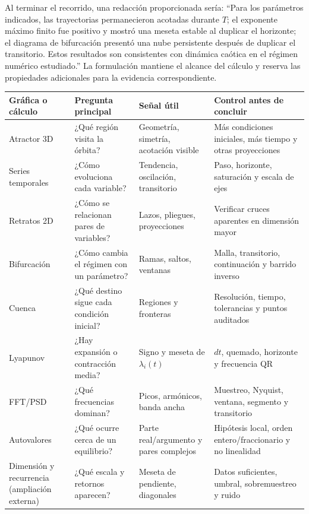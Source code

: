 \documentclass[11pt,a4paper]{article}
\begin{document}
Al terminar el recorrido, una redacción proporcionada sería: ``Para los parámetros
indicados, las trayectorias
permanecieron acotadas durante $T$; el exponente máximo finito fue positivo y mostró
una meseta estable al duplicar el horizonte; el diagrama de bifurcación presentó una
nube persistente después de duplicar el transitorio. Estos resultados son consistentes
con dinámica caótica en el régimen numérico estudiado.'' La formulación mantiene el
alcance del cálculo y reserva las propiedades adicionales para la evidencia correspondiente.

\begin{longtable}{>{\raggedright\arraybackslash}p{}
                  >{\raggedright\arraybackslash}p{}
                  >{\raggedright\arraybackslash}p{}
                  >{\raggedright\arraybackslash}p{}}
\toprule
Gráfica o cálculo & Pregunta principal & Señal útil & Control antes de concluir\\
\midrule
\endhead
Atractor 3D & ¿Qué región visita la órbita? & Geometría, simetría, acotación visible & Más condiciones iniciales, más tiempo y otras proyecciones\\
Series temporales & ¿Cómo evoluciona cada variable? & Tendencia, oscilación, transitorio & Paso, horizonte, saturación y escala de ejes\\
Retratos 2D & ¿Cómo se relacionan pares de variables? & Lazos, pliegues, proyecciones & Verificar cruces aparentes en dimensión mayor\\
Bifurcación & ¿Cómo cambia el régimen con un parámetro? & Ramas, saltos, ventanas & Malla, transitorio, continuación y barrido inverso\\
Cuenca & ¿Qué destino sigue cada condición inicial? & Regiones y fronteras & Resolución, tiempo, tolerancias y puntos auditados\\
Lyapunov & ¿Hay expansión o contracción media? & Signo y meseta de $\lambda_i(t)$ & $dt$, quemado, horizonte y frecuencia QR\\
FFT/PSD & ¿Qué frecuencias dominan? & Picos, armónicos, banda ancha & Muestreo, Nyquist, ventana, segmento y transitorio\\
Autovalores & ¿Qué ocurre cerca de un equilibrio? & Parte real/argumento y pares complejos & Hipótesis local, orden entero/fraccionario y no linealidad\\
Dimensión y recurrencia (ampliación externa) & ¿Qué escala y retornos aparecen? & Meseta de pendiente, diagonales & Datos suficientes, umbral, sobremuestreo y ruido\\
\bottomrule
\end{longtable}
\end{document}
